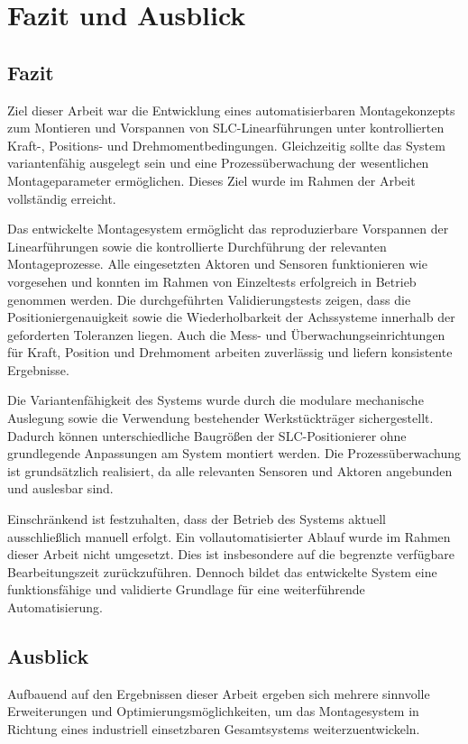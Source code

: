 \section{Fazit und Ausblick}

\subsection{Fazit}
Ziel dieser Arbeit war die Entwicklung eines automatisierbaren Montagekonzepts zum Montieren und Vorspannen von SLC-Linearführungen unter kontrollierten Kraft-, Positions- und Drehmomentbedingungen. Gleichzeitig sollte das System variantenfähig ausgelegt sein und eine Prozessüberwachung der wesentlichen Montageparameter ermöglichen. Dieses Ziel wurde im Rahmen der Arbeit vollständig erreicht.

Das entwickelte Montagesystem ermöglicht das reproduzierbare Vorspannen der Linearführungen sowie die kontrollierte Durchführung der relevanten Montageprozesse. Alle eingesetzten Aktoren und Sensoren funktionieren wie vorgesehen und konnten im Rahmen von Einzeltests erfolgreich in Betrieb genommen werden. Die durchgeführten Validierungstests zeigen, dass die Positioniergenauigkeit sowie die Wiederholbarkeit der Achssysteme innerhalb der geforderten Toleranzen liegen. Auch die Mess- und Überwachungseinrichtungen für Kraft, Position und Drehmoment arbeiten zuverlässig und liefern konsistente Ergebnisse.

Die Variantenfähigkeit des Systems wurde durch die modulare mechanische Auslegung sowie die Verwendung bestehender Werkstückträger sichergestellt. Dadurch können unterschiedliche Baugrößen der SLC-Positionierer ohne grundlegende Anpassungen am System montiert werden. Die Prozessüberwachung ist grundsätzlich realisiert, da alle relevanten Sensoren und Aktoren angebunden und auslesbar sind.

Einschränkend ist festzuhalten, dass der Betrieb des Systems aktuell ausschließlich manuell erfolgt. Ein vollautomatisierter Ablauf wurde im Rahmen dieser Arbeit nicht umgesetzt. Dies ist insbesondere auf die begrenzte verfügbare Bearbeitungszeit zurückzuführen. Dennoch bildet das entwickelte System eine funktionsfähige und validierte Grundlage für eine weiterführende Automatisierung.

\subsection{Ausblick}
Aufbauend auf den Ergebnissen dieser Arbeit ergeben sich mehrere sinnvolle Erweiterungen und Optimierungsmöglichkeiten, um das Montagesystem in Richtung eines industriell einsetzbaren Gesamtsystems weiterzuentwickeln.

